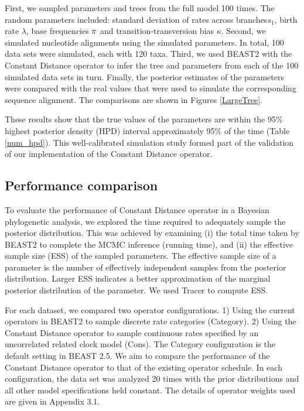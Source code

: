\documentclass{bmcart}
\begin{document}
First, we sampled parameters and trees from the full model 100 times. The random parameters included: standard deviation of rates across branches$s_1$, birth rate $\lambda $, base frequencies $\bf{\pi}$ and transition-transversion bias $\kappa$. Second, we simulated nucleotide alignments using the simulated parameters. In total, 100 data sets were simulated, each with 120 taxa. Third, we used BEAST2 with the Constant Distance operator to infer the tree and parameters from each of the 100 simulated data sets in turn. Finally, the posterior estimates of the parameters were compared with the real values that were used to simulate the corresponding sequence alignment. The comparisons are shown in Figures \ref{LargeTree}.

These results show that the true values of the parameters are within the 95\% highest posterior density (HPD) interval approximately 95\% of the time (Table \ref{num_hpd}). This well-calibrated simulation study formed part of the validation of our implementation of the Constant Distance operator.

\subsection*{Performance comparison}
To evaluate the performance of Constant Distance operator in a Bayesian phylogenetic analysis, we explored the time required to adequately sample the posterior distribution. This was achieved by examining (i) the total time taken by BEAST2 to complete the MCMC inference (running time), and (ii) the effective sample size (ESS) of the sampled parameters. The effective sample size of a parameter is the number of effectively independent samples from the posterior distribution. Larger ESS indicates a better approximation of the marginal posterior distribution of the parameter. We used Tracer \cite{Tracer} to compute ESS.

For each dataset, we compared two operator configurations. 1) Using the current operators in BEAST2 to sample discrete rate categories (Category). 2) Using the Constant Distance operator to sample continuous rates specified by an uncorrelated related clock model (Cons). The Category configuration is the default setting in BEAST 2.5. We aim to compare the performance of the Constant Distance operator to that of the existing operator schedule. In each configuration, the data set was analyzed 20 times with the prior distributions and all other model specifications held constant. The details of operator weights used are given in Appendix 3.1.
\end{document}
